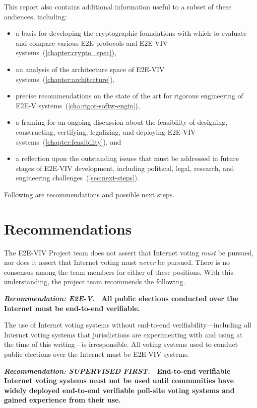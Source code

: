 This report also contains additional information useful to a subset of
these audiences, including:
\begin{itemize}
\item a basis for developing the cryptographic foundations with which
  to evaluate and compare various E2E protocols and E2E-VIV
  systems~(\autoref{chapter:crypto_spec}),
\item an analysis of the architecture space of E2E-VIV
  systems~(\autoref{chapter:architecture}),
\item precise recommendations on the state of the art for rigorous
  engineering of E2E-V systems~(\autoref{cha:rigor-softw-engin}),
\item a framing for an ongoing discussion about the feasibility of
  designing, constructing, certifying, legalizing, and deploying
  E2E-VIV systems~(\autoref{chapter:feasibility}), and
\item a reflection upon the outstanding issues that must be addressed
  in future stages of E2E-VIV development, including political, legal,
  research, and engineering challenges~(\autoref{sec:next-steps}).
\end{itemize}

Following are recommendations and possible next steps.

\section{Recommendations}

The E2E-VIV Project team does not assert that Internet voting
\emph{must} be pursued, nor does it assert that Internet voting must
\emph{never} be pursued. There is no consensus among the team members
for either of these positions. With this understanding, the project
team recommends the following.

\vspace{12pt} 
\textbf{\emph{Recommendation: E2E-V.} \ All public elections conducted
  over the Internet must be end-to-end verifiable.} 

The use of Internet voting systems without end-to-end
verifiability---including all Internet voting systems that
jurisdictions are experimenting with and using at the time of this
writing---is irresponsible. All voting systems used to conduct public
elections over the Internet must be E2E-VIV systems.

\vspace{12pt}
\textbf{\emph{Recommendation: SUPERVISED FIRST.} \ End-to-end
  verifiable Internet voting systems must not be used until
  communities have widely deployed end-to-end verifiable poll-site
  voting systems and gained experience from their use.}

